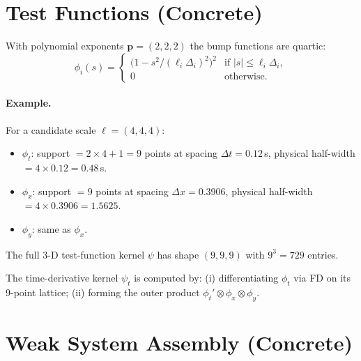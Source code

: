 \documentclass[11pt, letterpaper]{article}
\theoremstyle{definition}
\begin{document}
\section{Test Functions (Concrete)}
\label{sec:concrete-test}

With polynomial exponents $\mathbf{p} = (2, 2, 2)$ the bump functions
are quartic:
\begin{equation}
  \phi_i(s)
  = \begin{cases}
      \bigl(1 - s^{2}/(\ell_i\Delta_i)^{2}\bigr)^{2}
      & \text{if } |s| \le \ell_i \Delta_i, \\
      0 & \text{otherwise.}
    \end{cases}
\end{equation}

\paragraph{Example.}
For a candidate scale $\bm\ell = (4, 4, 4)$:
\begin{itemize}[nosep]
  \item $\phi_t$: support $= 2 \times 4 + 1 = 9$ points at spacing
    $\Delta t = 0.12$\,s, physical half-width $= 4 \times 0.12 = 0.48$\,s.
  \item $\phi_x$: support $= 9$ points at spacing $\Delta x = 0.3906$,
    physical half-width $= 4 \times 0.3906 = 1.5625$.
  \item $\phi_y$: same as $\phi_x$.
\end{itemize}
The full 3-D test-function kernel $\psi$ has shape $(9, 9, 9)$ with
$9^{3} = 729$ entries.

The time-derivative kernel $\psi_t$ is computed by:
(i) differentiating $\phi_t$ via FD on its 9-point lattice; (ii)
forming the outer product $\phi_t' \otimes \phi_x \otimes \phi_y$.

\section{Weak System Assembly (Concrete)}
\label{sec:concrete-weak}
\end{document}
